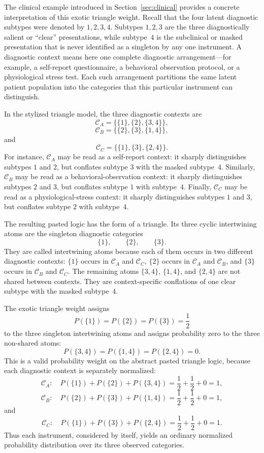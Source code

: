 \documentclass{article}
\begin{document}
The clinical example introduced in Section~\ref{sec:clinical}
provides a concrete interpretation of this exotic triangle weight.
Recall that the four latent diagnostic subtypes were denoted by
\(1,2,3,4\). Subtypes \(1,2,3\) are the three diagnostically salient
or ``clear'' presentations, while subtype~\(4\) is the subclinical or
masked presentation that is never identified as a singleton by any
one instrument. A diagnostic context means here one complete
diagnostic arrangement---for example, a self-report questionnaire, a
behavioral observation protocol, or a physiological stress test. Each
such arrangement partitions the same latent patient population into
the categories that this particular instrument can distinguish.

In the stylized triangle model, the three diagnostic contexts are
\[
\mathcal C_A=\{\{1\},\{2\},\{3,4\}\},
\]
\[
\mathcal C_B=\{\{2\},\{3\},\{1,4\}\},
\]
and
\[
\mathcal C_C=\{\{1\},\{3\},\{2,4\}\}.
\]
For instance, \(\mathcal C_A\) may be read as a self-report context:
it sharply distinguishes subtypes \(1\) and \(2\), but conflates
subtype \(3\) with the masked subtype~\(4\). Similarly,
\(\mathcal C_B\) may be read as a behavioral-observation context:
it sharply distinguishes subtypes \(2\) and \(3\), but conflates
subtype \(1\) with subtype~\(4\). Finally, \(\mathcal C_C\) may be
read as a physiological-stress context: it sharply distinguishes
subtypes \(1\) and \(3\), but conflates subtype \(2\) with
subtype~\(4\).

The resulting pasted logic has the form of a triangle. Its three
cyclic intertwining atoms are the singleton diagnostic categories
\[
\{1\},\qquad \{2\},\qquad \{3\}.
\]
They are called intertwining atoms because each of them occurs in
two different diagnostic contexts: \(\{1\}\) occurs in
\(\mathcal C_A\) and \(\mathcal C_C\), \(\{2\}\) occurs in
\(\mathcal C_A\) and \(\mathcal C_B\), and \(\{3\}\) occurs in
\(\mathcal C_B\) and \(\mathcal C_C\). The remaining atoms
\(\{3,4\}\), \(\{1,4\}\), and \(\{2,4\}\) are not shared between
contexts. They are context-specific conflations of one clear subtype
with the masked subtype~\(4\).

The exotic triangle weight assigns
\[
P(\{1\})=P(\{2\})=P(\{3\})=\frac12
\]
to the three singleton intertwining atoms and assigns probability
zero to the three non-shared atoms:
\[
P(\{3,4\})=P(\{1,4\})=P(\{2,4\})=0.
\]
This is a valid probability weight on the abstract pasted triangle
logic, because each diagnostic context is separately normalized:
\[
\mathcal C_A:\quad
P(\{1\})+P(\{2\})+P(\{3,4\})
=
\frac12+\frac12+0=1,
\]
\[
\mathcal C_B:\quad
P(\{2\})+P(\{3\})+P(\{1,4\})
=
\frac12+\frac12+0=1,
\]
and
\[
\mathcal C_C:\quad
P(\{1\})+P(\{3\})+P(\{2,4\})
=
\frac12+\frac12+0=1.
\]
Thus each instrument, considered by itself, yields an ordinary
normalized probability distribution over its three observed
categories.
\end{document}
